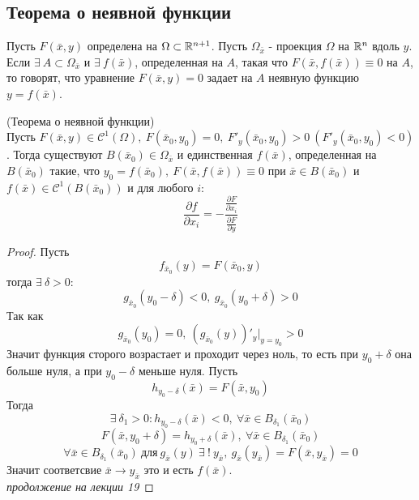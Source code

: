 \subsection{Теорема о неявной функции}
\begin{definition}%
    Пусть $F(\bar{x},y)$ определена на $\Omega\subset \mathbb{R}^{n+1}$. Пусть $\Omega_{\bar{x}}$ - проекция $\Omega$ на $\mathbb{R}^n$ вдоль $y$. Если $\exists\ A\subset \Omega_{\bar{x}}$ и $\exists\ f(\bar{x})$, определенная на $A$, такая что $F(\bar{x}, f(\bar{x}))\equiv 0$ на $A$, то говорят, что уравнение $F(\bar{x}, y)=0$ задает на $A$ неявную функцию $y=f(\bar{x})$.
\end{definition} 
\begin{theorem} (Теорема о неявной функции)\\
    Пусть $F(\bar{x},y)\in \mathcal{C}^1(\Omega),\ F(\bar{x}_0,y_0)=0,\ F'_y(\bar{x}_0,y_0)>0\ (F'_y(\bar{x}_0,y_0)<0)$. Тогда существуют $B(\bar{x}_0)\in \Omega_{\bar{x}}$ и единственная $f(\bar{x})$, определенная на $B(\bar{x}_0)$ такие, что $y_0=f(\bar{x}_0),\ F(\bar{x},f(\bar{x}))\equiv 0$ при $\bar{x}\in B(\bar{x}_0)$ и $f(\bar{x})\in \mathcal{C}^1(B(\bar{x}_0))$ и для любого $i$:
    \[\frac{\partial {f}}{\partial {x_i}}=-\frac{\frac{\partial {F}}{\partial {x_i}}}{\frac{\partial {F}}{\partial {y}}}\]
\end{theorem} 
\begin{proof}
    Пусть 
    \[f_{\bar{x}_0}(y)=F(\bar{x}_0,y)\] 
    тогда $\exists\ \delta>0$:
    \[g_{\bar{x}_0}(y_0-\delta)<0,\ g_{\bar{x}_0}(y_0+\delta)>0\]
    Так как 
    \[g_{\bar{x}_0}(y_0)=0,\ (g_{\bar{x}_0}(y))'_y|_{y=y_0}>0\]
    Значит функция сторого возрастает и проходит через ноль, то есть при $y_0+\delta$ она больше нуля, а при $y_0-\delta$ меньше нуля. Пусть
    \[h_{y_0-\delta}(\bar{x})=F(\bar{x},y_0)\] 
    Тогда 
    \[\exists\ \delta_1>0: h_{y_0-\delta}(\bar{x})<0,\ \forall \bar{x}\in B_{\delta_1}(\bar{x}_0)\]
    \[F(\bar{x}, y_0+\delta)=h_{y_0+\delta}(\bar{x}),\ \forall \bar{x}\in B_{\delta_1}(\bar{x}_0)\]
    \[\forall \bar{x}\in B_{\delta_1}(\bar{x}_0)\ \text{для}\ g_{\bar{x}}(y)\ \exists\ !\ y_{\bar{x}},\ g_{\bar{x}}(y_{\bar{x}})=F(\bar{x},y_{\bar{x}})=0\]
    Значит соответсвие $\bar{x}\to y_{\bar{x}}$ это и есть $f(\bar{x})$.\\
    \textit{продолжение на лекции 19}
\end{proof} 
